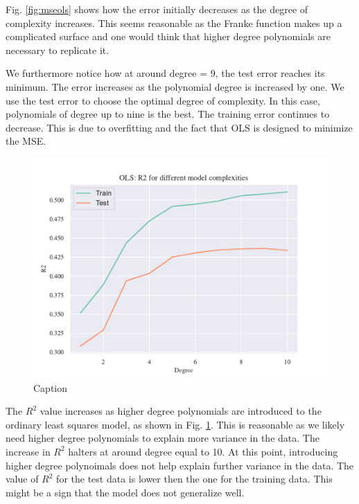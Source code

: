 Fig. \ref{fig:mseols} shows how the error initially decreases as the degree of complexity increases. This seems reasonable as the Franke function makes up a complicated surface and one would think that higher degree polynomials are necessary to replicate it. 

We furthermore notice how at around degree = 9, the test error reaches its minimum. The error increases as the polynomial degree is increased by one. We use the test error to choose the optimal degree of complexity. In this case, polynomials of degree up to nine is the best. The training error continues to decrease. This is due to overfitting and the fact that OLS is designed to minimize the MSE. 

\begin{figure}[h!]
    \centering
    \includegraphics[width=1\linewidth]{project_1_alt/figures/data/OLS_R2_Franke_Noise.pdf}
    \caption{Caption}
    \label{fig:r2ols}
\end{figure}

The $R^2$ value increases as higher degree polynomials are introduced to the ordinary least squares model, as shown in Fig. \ref{fig:r2ols}. This is reasonable as we likely need higher degree polynomials to explain more variance in the data. The increase in $R^2$ halters at around degree equal to 10. At this point, introducing higher degree polynoimals does not help explain further variance in the data. The value of $R^2$ for the test data is lower then the one for the training data. This might be a sign that the model does not generalize well. 

